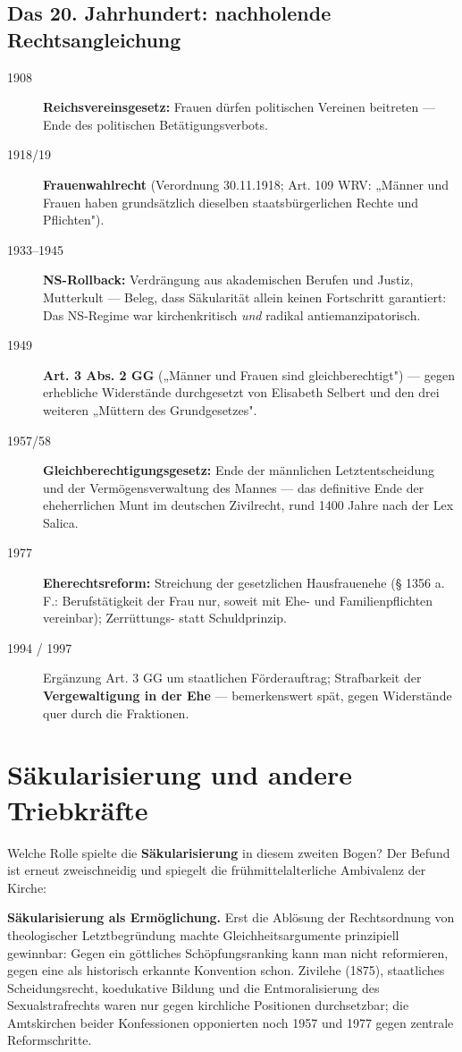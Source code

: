 \documentclass[11pt,a4paper,ngerman]{scrartcl}
\newcommand{\chipbase}[2]{\hspace{0pt}{\footnotesize\textcolor{#1}{[\textsc{#2}]}}}
\newcommand{\chipbelegt}[1]{\chipbase{chipgreen}{#1}}
\begin{document}
\subsection*{Das 20. Jahrhundert: nachholende Rechtsangleichung}

\begin{description}
\item[1908] \textbf{Reichsvereinsgesetz:} Frauen dürfen politischen Vereinen beitreten — Ende des politischen Betätigungsverbots.
\item[1918/19] \textbf{Frauenwahlrecht} (Verordnung 30.11.1918; Art. 109 WRV: „Männer und Frauen haben grundsätzlich dieselben staatsbürgerlichen Rechte und Pflichten").
\item[1933–1945] \textbf{NS-Rollback:} Verdrängung aus akademischen Berufen und Justiz, Mutterkult — Beleg, dass Säkularität allein keinen Fortschritt garantiert: Das NS-Regime war kirchenkritisch \emph{und} radikal antiemanzipatorisch.
\item[1949] \textbf{Art. 3 Abs. 2 GG} („Männer und Frauen sind gleichberechtigt") — gegen erhebliche Widerstände durchgesetzt von Elisabeth Selbert und den drei weiteren „Müttern des Grundgesetzes".
\item[1957/58] \textbf{Gleichberechtigungsgesetz:} Ende der männlichen Letztentscheidung und der Vermögensverwaltung des Mannes — das definitive Ende der eheherrlichen Munt im deutschen Zivilrecht, rund 1400 Jahre nach der Lex Salica.
\item[1977] \textbf{Eherechtsreform:} Streichung der gesetzlichen Hausfrauenehe (§ 1356 a. F.: Berufstätigkeit der Frau nur, soweit mit Ehe- und Familienpflichten vereinbar); Zerrüttungs- statt Schuldprinzip.
\item[1994 / 1997] Ergänzung Art. 3 GG um staatlichen Förderauftrag; Strafbarkeit der \textbf{Vergewaltigung in der Ehe} — bemerkenswert spät, gegen Widerstände quer durch die Fraktionen.
\end{description}


\section{Säkularisierung und andere Triebkräfte}

Welche Rolle spielte die \textbf{Säkularisierung} in diesem zweiten Bogen? Der Befund ist erneut zweischneidig und spiegelt die frühmittelalterliche Ambivalenz der Kirche:

\textbf{Säkularisierung als Ermöglichung.} Erst die Ablösung der Rechtsordnung von theologischer Letztbegründung machte Gleichheitsargumente prinzipiell gewinnbar: Gegen ein göttliches Schöpfungsranking kann man nicht reformieren, gegen eine als historisch erkannte Konvention schon. Zivilehe (1875), staatliches Scheidungsrecht, koedukative Bildung und die Entmoralisierung des Sexualstrafrechts waren nur gegen kirchliche Positionen durchsetzbar; die Amtskirchen beider Konfessionen opponierten noch 1957 und 1977 gegen zentrale Reformschritte. \chipbelegt{belegt}
\end{document}
